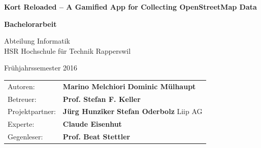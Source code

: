 \begin{titlepage}

\begin{figure}[H]
\hfill
{}
\end{figure}

\vspace{2cm}

\begin{center}
{ \Large
	\textbf{Kort Reloaded -- A Gamified App for Collecting OpenStreetMap Data}
	\vspace{1cm}

	\textbf{Bachelorarbeit}
	\vspace{1cm}

	Abteilung Informatik \\[0.2cm]
	HSR Hochschule für Technik Rapperswil
	\vspace{1cm}

	Frühjahrssemester 2016
}
\end{center}
\vspace{1cm}


\begin{table}[H] 
\centering 
\begin{tabular}{p{0.19\twocelltabwidth}p{0.4\twocelltabwidth}}
Autoren: & \textbf{Marino Melchiori} \newline
\textbf{Dominic Mülhaupt} \\ 
Betreuer: & \textbf{Prof. Stefan F. Keller} \\ 
Projektpartner: & \textbf{Jürg Hunziker} \newline
\textbf{Stefan Oderbolz} \newline
Liip AG\\ 
Experte: & \textbf{Claude Eisenhut} \\ 
Gegenleser: & \textbf{Prof. Beat Stettler} \\ 
\end{tabular}
\end{table}

\end{titlepage}